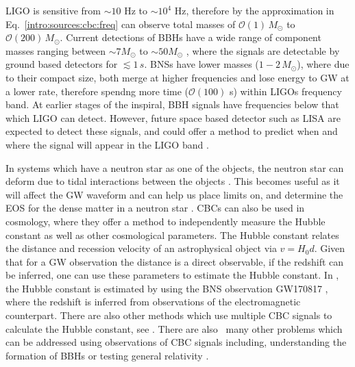 \gls{LIGO} is sensitive from $\sim 10$ Hz to $\sim 10^4$ Hz, therefore by the
approximation in Eq.~\ref{intro:sources:cbc:freq} can observe  total masses of $\mathcal{O}(1)\,M_{\odot}$ to
$\mathcal{O}(200)\, M_{\odot}$. Current detections of \glspl{BBH} have a wide
range of component masses ranging between $\sim 7M_{\odot}$ to $\sim
50M_{\odot}$
\citep{ligoscientificcollaborationandvirgocollaboration2019GWTC1GravitationalWave},
where the signals are detectable by ground based detectors for $\lesssim 1\,s$.
\glspl{BNS} have lower masses ($1-2\,M_{\odot}$), where due to their compact
size, both merge at higher frequencies and lose energy to \gls{GW} at a lower
rate, therefore spendng more time ($\mathcal{O}(100)$ s) within \glspl{LIGO}
frequency band.  At earlier stages of the inspiral, \gls{BBH} signals have
frequencies below that which \gls{LIGO} can detect.  However, future space
based detector such as \gls{LISA} \citep{danzmann1996LISALaser} are expected to
detect these signals, and could offer a method to predict when and where the
signal will appear in the \gls{LIGO} band \citep{sesana2016ProspectsMultiband}. 

In systems which have a neutron star as one of the objects, the neutron star
can deform due to tidal interactions between the objects
\citep{flanagan2008ConstrainingNeutronstar}.  This becomes useful as it will
affect the \gls{GW} waveform and can help us place limits on, and determine the
\gls{EOS} for the dense matter in a neutron star
\citep{harry2018ObservingMeasuring}.  \glspl{CBC} can also be used in
cosmology, where they offer a method to independently measure the Hubble
constant as well as other cosmological parameters.  The Hubble constant relates
the distance and recession velocity of an astrophysical object via $v = H_0 d$.
Given that for a \gls{GW} observation the distance is a direct observable, if
the redshift can be inferred, one can use these parameters to estimate the
Hubble constant.  In
\cite{theligoscientificcollaborationandthevirgocollaboration2017GravitationalwaveStandard},
the Hubble constant is estimated by using the \gls{BNS} observation GW170817
\citep{abbott2017GW170817Observation}, where the redshift is inferred from
observations of the electromagnetic counterpart.  There are also other methods
which use multiple \gls{CBC} signals to calculate the Hubble constant, see
\citep{delpozzo2012InferenceCosmological}.  There are also~ many other problems which can be addressed using observations
of \gls{CBC} signals including, understanding the formation of \glspl{BBH}
\citep{zevin2017ConstrainingFormation,mandel2018MergingStellarmass} or testing
general relativity
\citep{theligoscientificcollaborationandthevirgocollaboration2019TestsGeneral}. 

